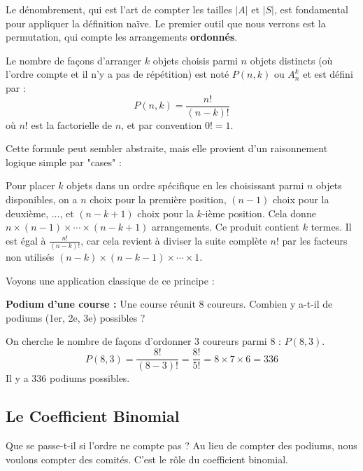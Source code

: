 Le dénombrement, qui est l'art de compter les tailles $|A|$ et $|S|$, est fondamental pour appliquer la définition naïve. Le premier outil que nous verrons est la permutation, qui compte les arrangements \textbf{ordonnés}.

\begin{definitionbox}
Le nombre de façons d'arranger $k$ objets choisis parmi $n$ objets distincts (où l'ordre compte et il n'y a pas de répétition) est noté $P(n, k)$ ou $A_n^k$ et est défini par :
$$ P(n, k) = \frac{n!}{(n-k)!} $$
où $n!$ est la factorielle de $n$, et par convention $0! = 1$.
\end{definitionbox}

Cette formule peut sembler abstraite, mais elle provient d'un raisonnement logique simple par "cases" :

\begin{intuitionbox}
Pour placer $k$ objets dans un ordre spécifique en les choisissant parmi $n$ objets disponibles, on a $n$ choix pour la première position, $(n-1)$ choix pour la deuxième, ..., et $(n-k+1)$ choix pour la $k$-ième position. Cela donne $n \times (n-1) \times \cdots \times (n-k+1)$ arrangements. Ce produit contient $k$ termes. Il est égal à $\frac{n!}{(n-k)!}$, car cela revient à diviser la suite complète $n!$ par les facteurs non utilisés $(n-k) \times (n-k-1) \times \cdots \times 1$.
\end{intuitionbox}

Voyons une application classique de ce principe :

\begin{examplebox}
\textbf{Podium d'une course :} Une course réunit 8 coureurs. Combien y a-t-il de podiums (1er, 2e, 3e) possibles ?

On cherche le nombre de façons d'ordonner 3 coureurs parmi 8 : $P(8, 3)$. 
$$ P(8, 3) = \frac{8!}{(8-3)!} = \frac{8!}{5!} = 8 \times 7 \times 6 = 336 $$
Il y a 336 podiums possibles.
\end{examplebox}

\subsection{Le Coefficient Binomial}

Que se passe-t-il si l'ordre ne compte pas ? Au lieu de compter des podiums, nous voulons compter des comités. C'est le rôle du coefficient binomial.

